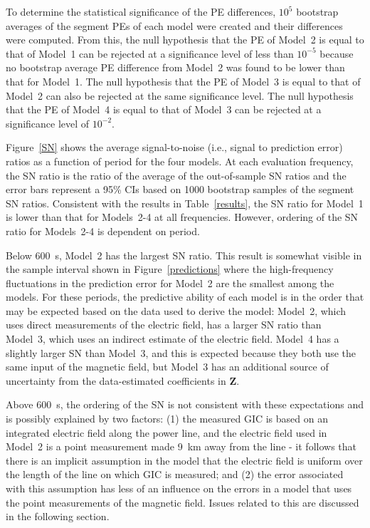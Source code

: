 \documentclass[draft,linenumbers]{agujournal2018}
\begin{document}
To determine the statistical significance of the PE differences, $10^5$ bootstrap averages of the segment PEs of each model were created and their differences were computed. From this, the null hypothesis that the PE of Model~2 is equal to that of Model~1 can be rejected at a significance level of less than $10^{-5}$ because no bootstrap average PE difference from Model~2 was found to be lower than that for Model~1. The null hypothesis that the PE of Model~3 is equal to that of Model~2 can also be rejected at the same significance level. The null hypothesis that the PE of Model~4 is equal to that of Model~3 can be rejected at a significance level of $10^{-2}$.

Figure~\ref{SN} shows the average signal-to-noise (i.e., signal to prediction error) ratios as a function of period for the four models. At each evaluation frequency, the SN ratio is the ratio of the average of the out-of-sample SN ratios and the error bars represent a 95\% CIs based on 1000 bootstrap samples of the segment SN ratios. Consistent with the results in Table~\ref{results}, the SN ratio for Model~1 is lower than that for Models~2-4 at all frequencies. However, ordering of the SN ratio for Models~2-4 is dependent on period.

Below $600$~s, Model~2 has the largest SN ratio. This result is somewhat visible in the sample interval shown in Figure~\ref{predictions} where the high-frequency fluctuations in the prediction error for Model~2 are the smallest among the models. For these periods, the predictive ability of each model is in the order that may be expected based on the data used to derive the model: Model~2, which uses direct measurements of the electric field, has a larger SN ratio than Model~3, which uses an indirect estimate of the electric field. Model~4 has a slightly larger SN than Model~3, and this is expected because they both use the same input of the magnetic field, but Model~3 has an additional source of uncertainty from the data-estimated coefficients in $\mathbf{Z}$.

Above $600$~s, the ordering of the SN is not consistent with these expectations and is possibly explained by two factors: (1) the measured GIC is based on an integrated electric field along the power line, and the electric field used in Model~2 is a point measurement made 9~km away from the line - it follows that there is an implicit assumption in the model that the electric field is uniform over the length of the line on which GIC is measured; and (2) the error associated with this assumption has less of an influence on the errors in a model that uses the point measurements of the magnetic field. Issues related to this are discussed in the following section.
\end{document}
